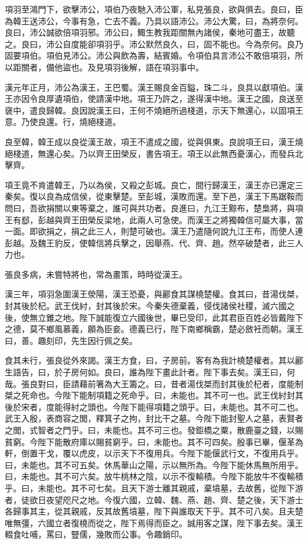 項羽至鴻門下，欲擊沛公，項伯乃夜馳入沛公軍，私見張良，欲與俱去。良曰，臣為韓王送沛公，今事有急，亡去不義。乃具以語沛公。沛公大驚，曰，為將奈何。良曰，沛公誠欲倍項羽邪。沛公曰，鯫生教我距關無內諸侯，秦地可盡王，故聽之。良曰，沛公自度能卻項羽乎。沛公默然良久，曰，固不能也。今為奈何。良乃固要項伯。項伯見沛公。沛公與飲為壽，結賓婚。令項伯具言沛公不敢倍項羽，所以距關者，備他盜也。及見項羽後解，語在項羽事中。

漢元年正月，沛公為漢王，王巴蜀。漢王賜良金百鎰，珠二斗，良具以獻項伯。漢王亦因令良厚遺項伯，使請漢中地。項王乃許之，遂得漢中地。漢王之國，良送至襃中，遣良歸韓。良因說漢王曰，王何不燒絕所過棧道，示天下無還心，以固項王意。乃使良還。行，燒絕棧道。

良至韓，韓王成以良從漢王故，項王不遣成之國，從與俱東。良說項王曰，漢王燒絕棧道，無還心矣。乃以齊王田榮反，書告項王。項王以此無西憂漢心，而發兵北擊齊。

項王竟不肯遣韓王，乃以為侯，又殺之彭城。良亡，間行歸漢王，漢王亦已還定三秦矣。復以良為成信侯，從東擊楚。至彭城，漢敗而還。至下邑，漢王下馬踞鞍而問曰，吾欲捐關以東等棄之，誰可與共功者。良進曰，九江王黥布，楚梟將，與項王有郄，彭越與齊王田榮反梁地，此兩人可急使。而漢王之將獨韓信可屬大事，當一面。即欲捐之，捐之此三人，則楚可破也。漢王乃遣隨何說九江王布，而使人連彭越。及魏王豹反，使韓信將兵擊之，因舉燕、代、齊、趙。然卒破楚者，此三人力也。

張良多病，未嘗特將也，常為畫策，時時從漢王。

漢三年，項羽急圍漢王滎陽，漢王恐憂，與酈食其謀橈楚權。食其曰，昔湯伐桀，封其後於杞。武王伐紂，封其後於宋。今秦失德棄義，侵伐諸侯社稷，滅六國之後，使無立錐之地。陛下誠能復立六國後世，畢已受印，此其君臣百姓必皆戴陛下之德，莫不鄉風慕義，願為臣妾。德義已行，陛下南鄉稱霸，楚必斂衽而朝。漢王曰，善。趣刻印，先生因行佩之矣。

食其未行，張良從外來謁。漢王方食，曰，子房前。客有為我計橈楚權者。其以酈生語告，曰，於子房何如。良曰，誰為陛下畫此計者。陛下事去矣。漢王曰，何哉。張良對曰，臣請藉前箸為大王籌之。曰，昔者湯伐桀而封其後於杞者，度能制桀之死命也。今陛下能制項籍之死命乎。曰，未能也。其不可一也。武王伐紂封其後於宋者，度能得紂之頭也。今陛下能得項籍之頭乎。曰，未能也。其不可二也。武王入殷，表商容之閭，釋箕子之拘，封比干之墓。今陛下能封聖人之墓，表賢者之閭，式智者之門乎。曰，未能也。其不可三也。發鉅橋之粟，散鹿臺之錢，以賜貧窮。今陛下能散府庫以賜貧窮乎。曰，未能也。其不可四矣。殷事已畢，偃革為軒，倒置干戈，覆以虎皮，以示天下不復用兵。今陛下能偃武行文，不復用兵乎。曰，未能也。其不可五矣。休馬華山之陽，示以無所為。今陛下能休馬無所用乎。曰，未能也。其不可六矣。放牛桃林之陰，以示不復輸積。今陛下能放牛不復輸積乎。曰，未能也。其不可七矣。且天下游士離其親戚，棄墳墓，去故舊，從陛下游者，徒欲日夜望咫尺之地。今復六國，立韓、魏、燕、趙、齊、楚之後，天下游士各歸事其主，從其親戚，反其故舊墳墓，陛下與誰取天下乎。其不可八矣。且夫楚唯無彊，六國立者復橈而從之，陛下焉得而臣之。誠用客之謀，陛下事去矣。漢王輟食吐哺，罵曰，豎儒，幾敗而公事。令趣銷印。

